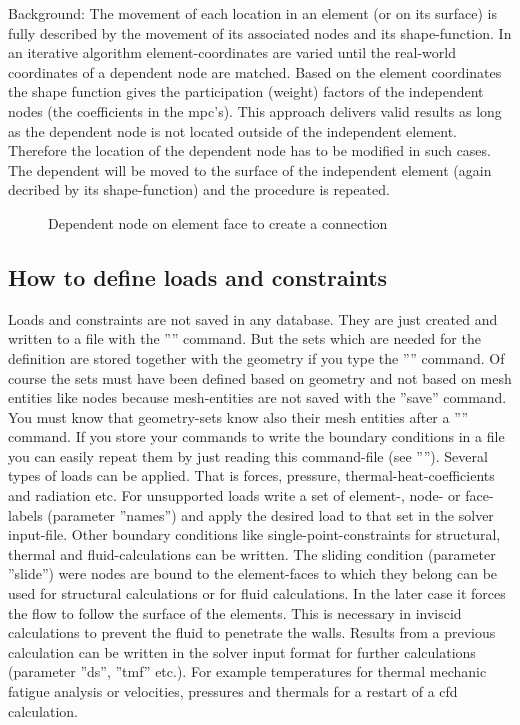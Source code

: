 \documentclass{article}
\begin{document}
\begin{appendix}
Background: The movement of each location in an element (or on its surface) is fully described by the movement of its associated nodes and its shape-function. In an iterative algorithm element-coordinates are varied until the real-world coordinates of a dependent node are matched. Based on the element coordinates the shape function gives the participation (weight) factors of the independent nodes (the coefficients in the mpc's). This approach delivers valid results as long as the dependent node is not located outside of the independent element. Therefore the location of the dependent node has to be modified in such cases. The dependent will be moved to the surface of the independent element (again decribed by its shape-function) and the procedure is repeated.

\begin{figure}[h]
\caption{\label{equation} Dependent node on element face to create a connection  }
\end{figure}


\subsection{\label{How to define loads and constraints}How to define loads and constraints}
Loads and constraints are not saved in any database. They are just created and written to a file with the '''' command. But the sets which are needed for the definition are stored together with the geometry if you type the '''' command. Of course the sets must have been defined based on geometry and not based on mesh entities like nodes because mesh-entities are not saved with the ''save'' command. You must know that geometry-sets know also their mesh entities after a '''' command.
If you store your commands to write the boundary conditions in a file you can easily repeat them by just reading this command-file (see ''''). Several types of loads can be applied. That is forces, pressure, thermal-heat-coefficients and radiation etc. For unsupported loads write a set of element-, node- or face-labels (parameter ''names'') and apply the desired load to that set in the solver input-file. Other boundary conditions like single-point-constraints for structural, thermal and fluid-calculations can be written. The sliding condition (parameter ''slide'') were nodes are bound to the element-faces to which they belong can be used for structural calculations or for fluid calculations. In the later case it forces the flow to follow the surface of the elements. This is necessary in inviscid calculations to prevent the fluid to penetrate the walls. Results from a previous calculation can be written in the solver input format for further calculations (parameter ''ds'', ''tmf'' etc.). For example temperatures for thermal mechanic fatigue analysis or velocities, pressures and thermals for a restart of a cfd calculation.



\end{appendix}
\end{document}
